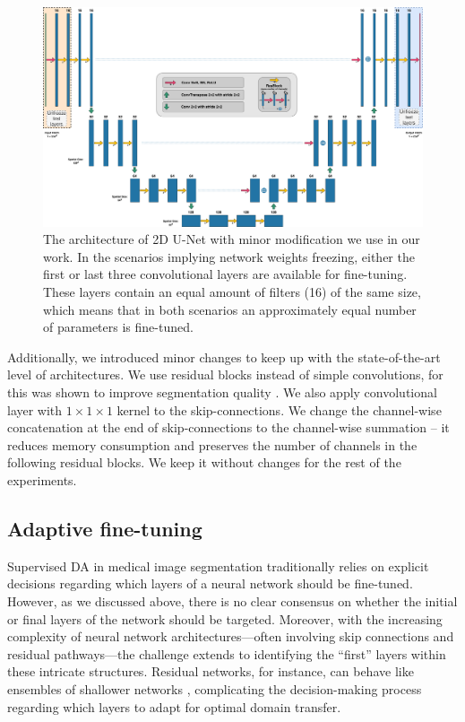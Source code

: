 \begin{figure}[!ht]
	\includegraphics[width=\linewidth]{Dissertation/Figures/2_mri/unet2d_da.pdf}
	\caption{The architecture of 2D U-Net \cite{ronneberger2015u} with minor modification we use in our work. In the scenarios implying network weights freezing, either the first or last three convolutional layers are available for fine-tuning. These layers contain an equal amount of filters (16) of the same size, which means that in both scenarios an approximately equal number of parameters is fine-tuned.}
	\label{fig:mri:unet2d_da}
\end{figure}

Additionally, we introduced minor changes to keep up with the state-of-the-art level of architectures. We use residual blocks \cite{he2016deep} instead of simple convolutions, for this was shown to improve segmentation quality \cite{milletari2016v}. We also apply convolutional layer with $1 \times 1 \times 1$ kernel to the skip-connections. We change the channel-wise concatenation at the end of skip-connections to the channel-wise summation --  it reduces memory consumption and preserves the number of channels in the following residual blocks. We keep it without changes for the rest of the experiments. %


\subsection{Adaptive fine-tuning}

Supervised DA in medical image segmentation traditionally relies on explicit decisions regarding which layers of a neural network should be fine-tuned. However, as we discussed above, there is no clear consensus on whether the initial or final layers of the network should be targeted. Moreover, with the increasing complexity of neural network architectures---often involving skip connections and residual pathways---the challenge extends to identifying the ``first'' layers within these intricate structures. Residual networks, for instance, can behave like ensembles of shallower networks \cite{veit2016residual}, complicating the decision-making process regarding which layers to adapt for optimal domain transfer.

